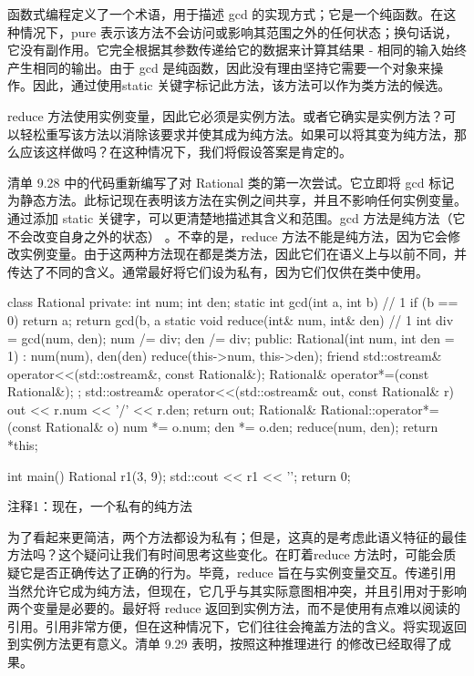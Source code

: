 函数式编程定义了一个术语，用于描述 gcd 的实现方式；它是一个纯函数。在这种情况下，pure 表示该方法不会访问或影响其范围之外的任何状态；换句话说，它没有副作用。它完全根据其参数传递给它的数据来计算其结果 - 相同的输入始终产生相同的输出。由于 gcd 是纯函数，因此没有理由坚持它需要一个对象来操作。因此，通过使用static 关键字标记此方法，该方法可以作为类方法的候选。

reduce 方法使用实例变量，因此它必须是实例方法。或者它确实是实例方法？可以轻松重写该方法以消除该要求并使其成为纯方法。如果可以将其变为纯方法，那么应该这样做吗？在这种情况下，我们将假设答案是肯定的。


清单 9.28 中的代码重新编写了对 Rational 类的第一次尝试。它立即将 gcd 标记为静态方法。此标记现在表明该方法在实例之间共享，并且不影响任何实例变量。通过添加 static 关键字，可以更清楚地描述其含义和范围。gcd 方法是纯方法（它不会改变自身之外的状态） 。不幸的是，reduce 方法不能是纯方法，因为它会修改实例变量。由于这两种方法现在都是类方法，因此它们在语义上与以前不同，并传达了不同的含义。通常最好将它们设为私有，因为它们仅供在类中使用。


\begin{cpp}
class Rational {
  private:
  int num;
  int den;
  static int gcd(int a, int b) { // 1
    if (b == 0)
      return a;
    return gcd(b, a %
  }
  static void reduce(int& num, int& den) { // 1
    int div = gcd(num, den);
    num /= div;
    den /= div;
  }
public:
  Rational(int num, int den = 1) : num(num), den(den) {
    reduce(this->num, this->den); }
  friend std::ostream& operator<<(std::ostream&, const Rational&);
  Rational& operator*=(const Rational&);
};
std::ostream& operator<<(std::ostream& out, const Rational& r) {
  out << r.num << '/' << r.den;
  return out;
}
Rational& Rational::operator*=(const Rational& o) {
  num *= o.num;
  den *= o.den;
  reduce(num, den);
  return *this;
}

int main() {
  Rational r1(3, 9);
  std::cout << r1 << '\n';
  return 0;
}
\end{cpp}

{\footnotesize
注释1：现在，一个私有的纯方法
}

为了看起来更简洁，两个方法都设为私有；但是，这真的是考虑此语义特征的最佳方法吗？这个疑问让我们有时间思考这些变化。在盯着reduce 方法时，可能会质疑它是否正确传达了正确的行为。毕竟，reduce 旨在与实例变量交互。传递引用当然允许它成为纯方法，但现在，它几乎与其实际意图相冲突，并且引用对于影响两个变量是必要的。最好将 reduce 返回到实例方法，而不是使用有点难以阅读的引用。引用非常方便，但在这种情况下，它们往往会掩盖方法的含义。将实现返回到实例方法更有意义。清单 9.29 表明，按照这种推理进行 的修改已经取得了成果。

